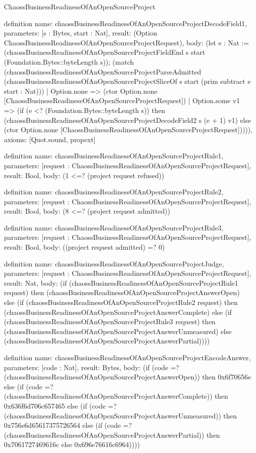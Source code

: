 \begin{lexlean}{ChaossBusinessReadinessOfAnOpenSourceProject}
\begin{semanticmodule}
definition{
  name: chaossBusinessReadinessOfAnOpenSourceProjectDecodeField1,
  parameters: [s : Bytes, start : Nat],
  result: (Option ChaossBusinessReadinessOfAnOpenSourceProjectRequest),
  body: (let e : Nat := (chaossBusinessReadinessOfAnOpenSourceProjectFieldEnd s start (Foundation.Bytes::byteLength s)); (match (chaossBusinessReadinessOfAnOpenSourceProjectParseAdmitted (chaossBusinessReadinessOfAnOpenSourceProjectSliceOf s start (prim subtract e start : Nat)))
    | Option.none => (ctor Option.none [ChaossBusinessReadinessOfAnOpenSourceProjectRequest])
    | Option.some v1 => (if (e <? (Foundation.Bytes::byteLength s)) then (chaossBusinessReadinessOfAnOpenSourceProjectDecodeField2 s (e + 1) v1) else (ctor Option.none [ChaossBusinessReadinessOfAnOpenSourceProjectRequest])))),
  axioms: [Quot.sound, propext]
}

definition{
  name: chaossBusinessReadinessOfAnOpenSourceProjectRule1,
  parameters: [request : ChaossBusinessReadinessOfAnOpenSourceProjectRequest],
  result: Bool,
  body: (1 <=? (project request refused))
}

definition{
  name: chaossBusinessReadinessOfAnOpenSourceProjectRule2,
  parameters: [request : ChaossBusinessReadinessOfAnOpenSourceProjectRequest],
  result: Bool,
  body: (8 <=? (project request admitted))
}

definition{
  name: chaossBusinessReadinessOfAnOpenSourceProjectRule3,
  parameters: [request : ChaossBusinessReadinessOfAnOpenSourceProjectRequest],
  result: Bool,
  body: ((project request admitted) =? 0)
}

definition{
  name: chaossBusinessReadinessOfAnOpenSourceProjectJudge,
  parameters: [request : ChaossBusinessReadinessOfAnOpenSourceProjectRequest],
  result: Nat,
  body: (if (chaossBusinessReadinessOfAnOpenSourceProjectRule1 request) then (chaossBusinessReadinessOfAnOpenSourceProjectAnswerOpen) else (if (chaossBusinessReadinessOfAnOpenSourceProjectRule2 request) then (chaossBusinessReadinessOfAnOpenSourceProjectAnswerComplete) else (if (chaossBusinessReadinessOfAnOpenSourceProjectRule3 request) then (chaossBusinessReadinessOfAnOpenSourceProjectAnswerUnmeasured) else (chaossBusinessReadinessOfAnOpenSourceProjectAnswerPartial))))
}

definition{
  name: chaossBusinessReadinessOfAnOpenSourceProjectEncodeAnswer,
  parameters: [code : Nat],
  result: Bytes,
  body: (if (code =? (chaossBusinessReadinessOfAnOpenSourceProjectAnswerOpen)) then 0x6f70656e else (if (code =? (chaossBusinessReadinessOfAnOpenSourceProjectAnswerComplete)) then 0x636f6d706c657465 else (if (code =? (chaossBusinessReadinessOfAnOpenSourceProjectAnswerUnmeasured)) then 0x756e6d65617375726564 else (if (code =? (chaossBusinessReadinessOfAnOpenSourceProjectAnswerPartial)) then 0x7061727469616c else 0x696e76616c6964))))
}


\end{semanticmodule}
\end{lexlean}
